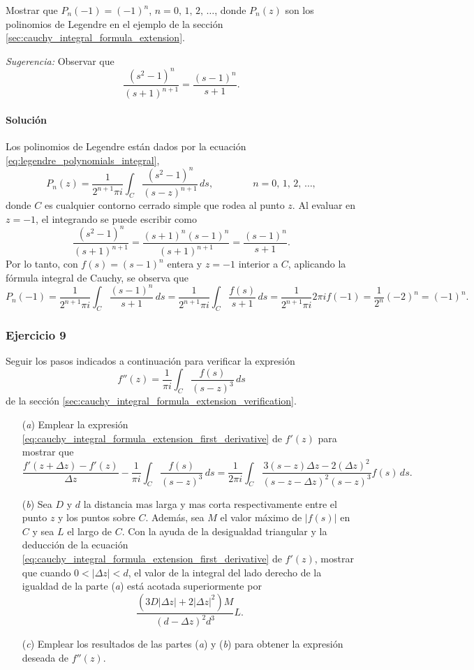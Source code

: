 \documentclass[a4paper]{report}
\begin{document}
Mostrar que \(P_n(-1)=(-1)^n\), \(n=0,\,1,\,2,\,\dots\), donde \(P_n(z)\) son los polinomios de Legendre en el ejemplo de la sección \ref{sec:cauchy_integral_formula_extension}.

\emph{Sugerencia:} Observar que 
\[
 \frac{(s^2-1)^n}{(s+1)^{n+1}}=\frac{(s-1)^n}{s+1}.
\]

\paragraph{Solución} Los polinomios de Legendre están dados por la ecuación \ref{eq:legendre_polynomials_integral},
\[
 P_n(z)=\frac{1}{2^{n+1}\pi i}\int_{C}\frac{(s^2-1)^n}{(s-z)^{n+1}}\,ds,
 \qquad\qquad 
 n=0,\,1,\,2,\,\dots,
\]
donde \(C\) es cualquier contorno cerrado simple que rodea al punto \(z\). Al evaluar en \(z=-1\), el integrando se puede escribir como
\[
 \frac{(s^2-1)^n}{(s+1)^{n+1}}=\frac{(s+1)^n(s-1)^n}{(s+1)^{n+1}}=\frac{(s-1)^n}{s+1}.
\]
Por lo tanto, con \(f(s)=(s-1)^n\) entera y \(z=-1\) interior a \(C\), aplicando la fórmula integral de Cauchy, se observa que
\[
 P_n(-1)=\frac{1}{2^{n+1}\pi i}\int_{C}\frac{(s-1)^n}{s+1}\,ds=\frac{1}{2^{n+1}\pi i}\int_{C}\frac{f(s)}{s+1}\,ds
 =\frac{1}{2^{n+1}\pi i}2\pi if(-1)=\frac{1}{2^n}(-2)^n=(-1)^n.
\]

\subsubsection*{Ejercicio 9}

Seguir los pasos indicados a continuación para verificar la expresión 
\[
 f''(z)=\frac{1}{\pi i}\int_C\frac{f(s)}{(s-z)^3}\,ds
\]
de la sección \ref{sec:cauchy_integral_formula_extension_verification}.
\begin{enumerate}
 \item[(\textit{a})] Emplear la expresión \ref{eq:cauchy_integral_formula_extension_first_derivative} de \(f'(z)\) para mostrar que 
 \begin{equation}\label{eq:exercise_57_09_tmp2}
  \frac{f'(z+\Delta z)-f'(z)}{\Delta z}-\frac{1}{\pi i}\int_C\frac{f(s)}{(s-z)^3}\,ds
  =\frac{1}{2\pi i}\int_C\frac{3(s-z)\Delta z-2(\Delta z)^2}{(s-z-\Delta z)^2(s-z)^3}f(s)\,ds.
 \end{equation}
 \item[(\textit{b})] Sea \(D\) y \(d\) la distancia mas larga y mas corta respectivamente entre el punto \(z\) y los puntos sobre \(C\). Además, sea \(M\) el valor máximo de \(|f(s)|\) en \(C\) y sea \(L\) el largo de \(C\). Con la ayuda de la desigualdad triangular y la deducción de la ecuación \ref{eq:cauchy_integral_formula_extension_first_derivative} de \(f'(z)\), mostrar que cuando \(0<|\Delta z|<d\), el valor de la integral del lado derecho de la igualdad de la parte (\textit{a}) está acotada superiormente por 
 \[
  \frac{(3D|\Delta z|+2|\Delta z|^2)M}{(d-\Delta z)^2d^3}L.
 \]
 \item[(\textit{c})] Emplear los resultados de las partes (\textit{a}) y (\textit{b}) para obtener la expresión deseada de \(f''(z)\).
\end{enumerate}
\end{document}
